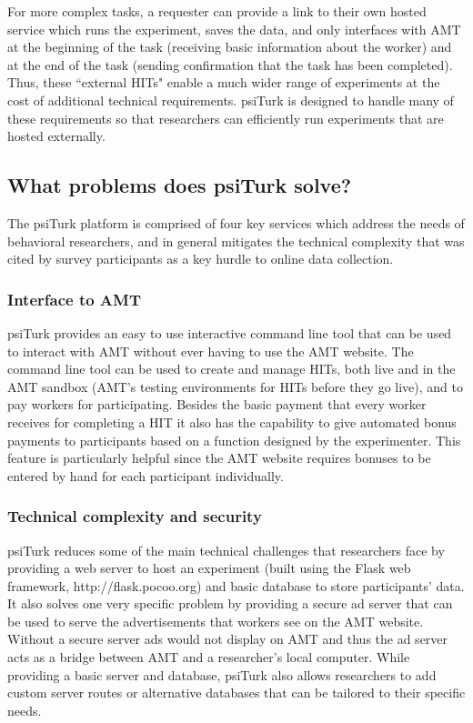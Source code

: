 \documentclass[twocolumn]{svjour3}          %
\begin{document}
For more complex tasks, a requester can provide a link to their own hosted service which runs the experiment, saves the data, and only interfaces with AMT at the beginning of the task (receiving basic information about the worker) and at the end of the task (sending confirmation that the task has been completed).
Thus, these ``external HITs" enable a much wider range of experiments at the cost of additional technical requirements.
psiTurk is designed to handle many of these requirements so that researchers can efficiently run experiments that are hosted externally.


\subsection{What problems does psiTurk solve?}

The psiTurk platform is comprised of four key services which address the needs of behavioral researchers, and in general mitigates the technical complexity that was cited by survey participants as a key hurdle to online data collection.

\subsubsection{Interface to AMT}
psiTurk provides an easy to use interactive command line tool that can be used to 
interact with AMT without ever having to use the AMT website.  
The command line tool can be used to create and manage HITs, both live and in the AMT sandbox 
(AMT's testing environments for HITs before they go live), and to pay workers for
participating. Besides the basic payment that every worker receives for completing a HIT
it also has the capability to give automated bonus payments to participants based on a function
designed by the experimenter. This feature is particularly helpful since the AMT website
requires bonuses to be entered by hand for each participant individually.


\subsubsection{Technical complexity and security}
psiTurk reduces some of the main technical challenges that researchers face by providing a 
web server to host an experiment (built using the Flask web framework, http://flask.pocoo.org) and basic database to store participants' data.
It also solves one very specific problem by providing a secure ad server that can
be used to serve the advertisements that workers see on the AMT website. Without a secure server
 ads would not display on AMT and thus the ad server acts as a bridge between AMT and 
 a researcher's local computer. 
While providing a basic server and database, psiTurk also allows researchers to add custom
server routes or alternative databases that can be tailored to their specific needs.
\end{document}
